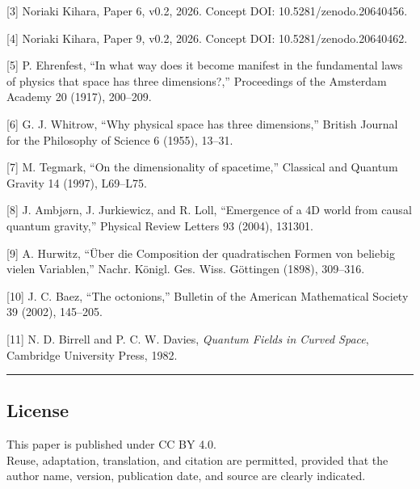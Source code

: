 \documentclass[
]{article}
\begin{document}
{[}3{]} Noriaki Kihara, Paper 6, v0.2, 2026. Concept DOI: 10.5281/zenodo.20640456.

{[}4{]} Noriaki Kihara, Paper 9, v0.2, 2026. Concept DOI: 10.5281/zenodo.20640462.

{[}5{]} P. Ehrenfest, ``In what way does it become manifest in the
fundamental laws of physics that space has three dimensions?,''
Proceedings of the Amsterdam Academy 20 (1917), 200--209.

{[}6{]} G. J. Whitrow, ``Why physical space has three dimensions,''
British Journal for the Philosophy of Science 6 (1955), 13--31.

{[}7{]} M. Tegmark, ``On the dimensionality of spacetime,'' Classical
and Quantum Gravity 14 (1997), L69--L75.

{[}8{]} J. Ambjørn, J. Jurkiewicz, and R. Loll, ``Emergence of a 4D
world from causal quantum gravity,'' Physical Review Letters 93 (2004),
131301.

{[}9{]} A. Hurwitz, ``Über die Composition der quadratischen Formen von
beliebig vielen Variablen,'' Nachr. Königl. Ges. Wiss. Göttingen (1898),
309--316.

{[}10{]} J. C. Baez, ``The octonions,'' Bulletin of the American
Mathematical Society 39 (2002), 145--205.

{[}11{]} N. D. Birrell and P. C. W. Davies, \emph{Quantum Fields in
Curved Space}, Cambridge University Press, 1982.

\begin{center}\rule{0.5\linewidth}{0.5pt}\end{center}

\subsection{License}\label{license}

This paper is published under CC BY 4.0.\\
Reuse, adaptation, translation, and citation are permitted, provided
that the author name, version, publication date, and source are clearly
indicated.
\end{document}
